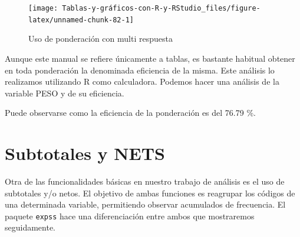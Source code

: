 \documentclass[
]{book}
\newenvironment{Shaded}{\begin{snugshade}}{\end{snugshade}}
\newcommand{\AttributeTok}[1]{\textcolor[rgb]{0.77,0.63,0.00}{#1}}
\newcommand{\ConstantTok}[1]{\textcolor[rgb]{0.00,0.00,0.00}{#1}}
\newcommand{\DecValTok}[1]{\textcolor[rgb]{0.00,0.00,0.81}{#1}}
\newcommand{\FunctionTok}[1]{\textcolor[rgb]{0.00,0.00,0.00}{#1}}
\newcommand{\NormalTok}[1]{#1}
\newcommand{\OtherTok}[1]{\textcolor[rgb]{0.56,0.35,0.01}{#1}}
\newcommand{\SpecialCharTok}[1]{\textcolor[rgb]{0.00,0.00,0.00}{#1}}
\begin{document}
\begin{figure}[H]

{\centering \texttt{[image: Tablas-y-gráficos-con-R-y-RStudio\_files/figure-latex/unnamed-chunk-82-1]} 

}

\caption{Uso de ponderación con multi respuesta}\label{fig:unnamed-chunk-82}
\end{figure}

Aunque este manual se refiere únicamente a tablas, es bastante habitual obtener en toda ponderación la denominada eficiencia de la misma. Este análisis lo realizamos utilizando R como calculadora. Podemos hacer una análisis de la variable PESO y de su eficiencia.

\begin{Shaded}
\end{Shaded}

Puede observarse como la eficiencia de la ponderación es del 76.79 \%.

\hypertarget{subtotales-y-nets}{%
\section{Subtotales y NETS}\label{subtotales-y-nets}}

Otra de las funcionalidades básicas en nuestro trabajo de análisis es el uso de subtotales y/o netos. El objetivo de ambas funciones es reagrupar los códigos de una determinada variable, permitiendo observar acumulados de frecuencia. El paquete \texttt{expss} hace una diferenciación entre ambos que mostraremos seguidamente.
\end{document}
